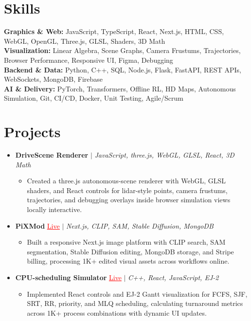 \documentclass[letterpaper,10pt]{article}
\newcommand{\itemTail}{\vspace{-4pt}}
\newcommand{\sectionGap}{\vspace{-8pt}}
\newcommand{\projGap}{\vspace{1pt}}
\newcommand{\resumeItem}[1]{\item\small{{#1 \itemTail}}}
\newcommand{\resumeProjectHeading}[1]{\item \small #1 \vspace{-2pt}}
\newcommand{\resumeProjectLink}[2]{\href{#1}{\textcolor{red}{\underline{#2}}}}
\newcommand{\resumeSubHeadingListStart}{\begin{itemize}[leftmargin=0.0in, label={}]}
\newcommand{\resumeSubHeadingListEnd}{\end{itemize}}
\newcommand{\resumeProjItemListStart}{\begin{itemize}[leftmargin=0.15in,label=\textbullet,itemsep=3pt,topsep=0pt,parsep=0pt,partopsep=0pt]}
\newcommand{\resumeProjItemListEnd}{\end{itemize}\vspace{-4pt}}
\begin{document}
\section{Skills}
\begin{itemize}[leftmargin=0.15in, label={}]
\small{\item{
\textbf{Graphics \& Web:} JavaScript, TypeScript, React, Next.js, HTML, CSS, WebGL, OpenGL, Three.js, GLSL, Shaders, 3D Math \\
\textbf{Visualization:} Linear Algebra, Scene Graphs, Camera Frustums, Trajectories, Browser Performance, Responsive UI, Figma, Debugging \\
\textbf{Backend \& Data:} Python, C++, SQL, Node.js, Flask, FastAPI, REST APIs, WebSockets, MongoDB, Firebase \\
\textbf{AI \& Delivery:} PyTorch, Transformers, Offline RL, HD Maps, Autonomous Simulation, Git, CI/CD, Docker, Unit Testing, Agile/Scrum
}}
\end{itemize}
\sectionGap
\section{Projects}
\resumeSubHeadingListStart
\vspace{3pt}

\resumeProjectHeading{\textbf{DriveScene Renderer} $|$ \emph{JavaScript, three.js, WebGL, GLSL, React, 3D Math}}
\resumeProjItemListStart
\resumeItem{Created a three.js autonomous-scene renderer with WebGL, GLSL shaders, and React controls for lidar-style points, camera frustums, trajectories, and debugging overlays inside browser simulation views locally interactive.}
\resumeProjItemListEnd
\projGap
\resumeProjectHeading{\textbf{PiXMod} \resumeProjectLink{https://pixmod.vercel.app/}{Live} $|$ \emph{Next.js, CLIP, SAM, Stable Diffusion, MongoDB}}
\resumeProjItemListStart
\resumeItem{Built a responsive Next.js image platform with CLIP search, SAM segmentation, Stable Diffusion editing, MongoDB storage, and Stripe billing, processing 1K+ edited visual assets across workflows online.}
\resumeProjItemListEnd
\projGap
\resumeProjectHeading{\textbf{CPU-scheduling Simulator} \resumeProjectLink{https://cpu-scheduler-amber.vercel.app/}{Live} $|$ \emph{C++, React, JavaScript, EJ-2}}
\resumeProjItemListStart
\resumeItem{Implemented React controls and EJ-2 Gantt visualization for FCFS, SJF, SRT, RR, priority, and MLQ scheduling, calculating turnaround metrics across 1K+ process combinations with dynamic UI updates.}
\resumeProjItemListEnd
\resumeSubHeadingListEnd
\end{document}
